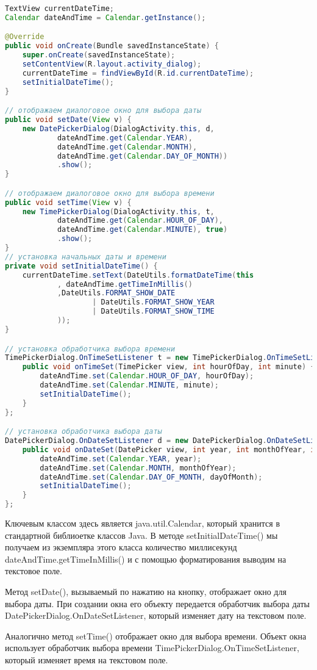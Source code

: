 \begin{lstlisting}[language=Java
	, label=lst:
	]
TextView currentDateTime;
Calendar dateAndTime = Calendar.getInstance();

@Override
public void onCreate(Bundle savedInstanceState) {
	super.onCreate(savedInstanceState);
	setContentView(R.layout.activity_dialog);
	currentDateTime = findViewById(R.id.currentDateTime);
	setInitialDateTime();
}

// отображаем диалоговое окно для выбора даты
public void setDate(View v) {
	new DatePickerDialog(DialogActivity.this, d,
			dateAndTime.get(Calendar.YEAR),
			dateAndTime.get(Calendar.MONTH),
			dateAndTime.get(Calendar.DAY_OF_MONTH))
			.show();
}

// отображаем диалоговое окно для выбора времени
public void setTime(View v) {
	new TimePickerDialog(DialogActivity.this, t,
			dateAndTime.get(Calendar.HOUR_OF_DAY),
			dateAndTime.get(Calendar.MINUTE), true)
			.show();
}
// установка начальных даты и времени
private void setInitialDateTime() {
	currentDateTime.setText(DateUtils.formatDateTime(this
			, dateAndTime.getTimeInMillis()
			,DateUtils.FORMAT_SHOW_DATE
					| DateUtils.FORMAT_SHOW_YEAR
					| DateUtils.FORMAT_SHOW_TIME
			));
}

// установка обработчика выбора времени
TimePickerDialog.OnTimeSetListener t = new TimePickerDialog.OnTimeSetListener() {
	public void onTimeSet(TimePicker view, int hourOfDay, int minute) {
		dateAndTime.set(Calendar.HOUR_OF_DAY, hourOfDay);
		dateAndTime.set(Calendar.MINUTE, minute);
		setInitialDateTime();
	}
};

// установка обработчика выбора даты
DatePickerDialog.OnDateSetListener d = new DatePickerDialog.OnDateSetListener() {
	public void onDateSet(DatePicker view, int year, int monthOfYear, int dayOfMonth) {
		dateAndTime.set(Calendar.YEAR, year);
		dateAndTime.set(Calendar.MONTH, monthOfYear);
		dateAndTime.set(Calendar.DAY_OF_MONTH, dayOfMonth);
		setInitialDateTime();
	}
};
\end{lstlisting}

Ключевым классом здесь является java.util.Calendar, который хранится в
стандартной библиоетке классов Java. В методе setInitialDateTime() мы
получаем из экземпляра этого класса количество миллисекунд
dateAndTime.getTimeInMillis() и с помощью форматирования выводим на
текстовое поле.\par
Метод setDate(), вызываемый по нажатию на кнопку, отображает окно для
выбора даты. При создании окна его объекту передается обработчик выбора
даты DatePickerDialog.OnDateSetListener, который изменяет дату на
текстовом поле.\par
Аналогично метод setTime() отображает окно для выбора времени. Объект
окна использует обработчик выбора времени
TimePickerDialog.OnTimeSetListener, который изменяет время на текстовом
поле.

